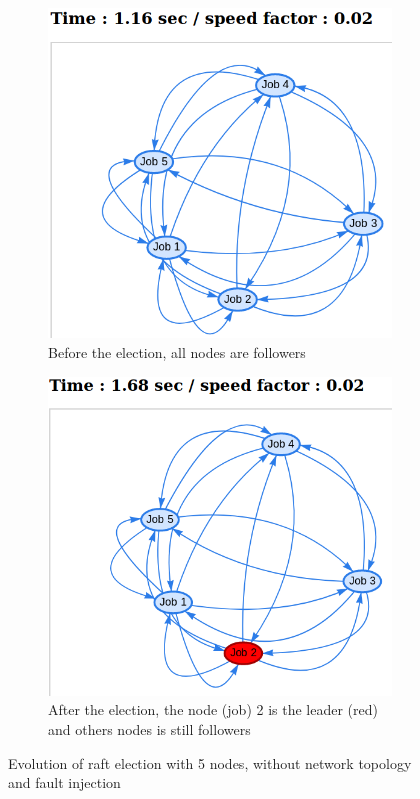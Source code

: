 \documentclass{eplmastersthesis}
\begin{document}
        \begin{figure}[H]
          \begin{subfigure}{.5\textwidth}
            \centering
            \includegraphics[width=1.0\linewidth]{figures/user_case/no_crash_no_topo1.png}
            \caption{Before the election, all nodes are followers}
            \label{fig:topo1}
          \end{subfigure}
          \begin{subfigure}{.5\textwidth}
            \centering
            \includegraphics[width=1.0\linewidth]{figures/user_case/no_crash_no_topo2.png}
            \caption{After the election, the node (job) 2 is the leader (red) and others nodes is still followers}
            \label{fig:topo2}
          \end{subfigure}
          \caption{Evolution of raft election with 5 nodes, without network topology and fault injection}
          \label{fig:topologies}
        \end{figure}
\end{document}
